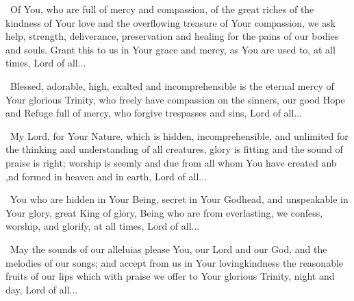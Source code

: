 \documentclass[12pt,twoside,a5paper]{article}
\begin{document}
\cc~Of You, who are full of mercy and compassion, of the great riches of the kindness of Your love and the overflowing treasure of Your compassion, we ask help, strength, deliverance, preservation and healing for the pains of our bodies and souls. Grant this to us in Your grace and mercy, as You are used to, at all times, Lord of all...

\cc~Blessed, adorable, high, exalted and incomprehensible is the eternal mercy of Your glorious Trinity, who freely have compassion on the sinners, our good Hope and Refuge full of mercy, who forgive trespasses and sins, Lord of all...




\cc~My Lord, for Your Nature, which is hidden, incomprehensible, and unlimited for the thinking and understanding of all creatures, glory is fitting and the sound of praise is right; worship is seemly and due from all whom You have created anb ,nd formed in heaven and in earth, Lord of all...



\begin{halfparskip}
   

  \cc~You who are hidden in Your Being, secret in Your Godhead, and unspeakable in Your glory, great King of glory, Being who are from everlasting, we confess, worship, and glorify, at all times, Lord of all...
\end{halfparskip}

\begin{halfparskip}
   

  \cc~May the sounds of our alleluias please You, our Lord and our God, and the melodies of our songs; and accept from us in Your lovingkindness the reasonable fruits of our lips which with praise we offer to Your glorious Trinity, night and day, Lord of all...
\end{halfparskip}

\end{document}
